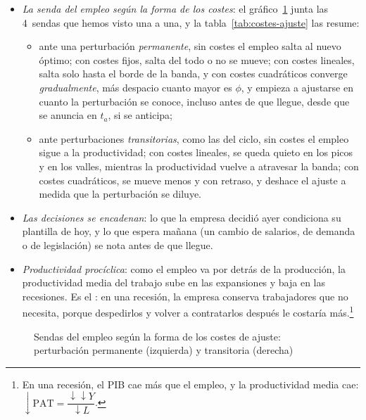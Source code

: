 \documentclass[11pt]{article}
\begin{document}
\begin{itemize}
\item \emph{La senda del empleo según la forma de los costes}: el gráfico~\ref{fig:sendas-ajuste} junta las 4~sendas que hemos visto una a una, y la tabla~\ref{tab:costes-ajuste} las resume:
  \begin{itemize}
  \item ante una perturbación \emph{permanente}, sin costes el empleo salta al nuevo óptimo; con costes fijos, salta del todo o no se mueve; con costes lineales, salta solo hasta el borde de la banda, y con costes cuadráticos converge \emph{gradualmente}, más despacio cuanto mayor es $\phi$, y empieza a ajustarse en cuanto la perturbación se conoce, incluso antes de que llegue, desde que se anuncia en $t_a$, si se anticipa;
  \item ante perturbaciones \emph{transitorias}, como las del ciclo, sin costes el empleo sigue a la productividad; con costes lineales, se queda quieto en los picos y en los valles, mientras la productividad vuelve a atravesar la banda; con costes cuadráticos, se mueve menos y con retraso, y deshace el ajuste a medida que la perturbación se diluye.
  \end{itemize}
\item \emph{Las decisiones se encadenan}: lo que la empresa decidió ayer condiciona su plantilla de hoy, y lo que espera mañana (un cambio de salarios, de demanda o de legislación) se nota antes de que llegue.
\item \emph{Productividad procíclica}: como el empleo va por detrás de la producción, la productividad media del trabajo sube en las expansiones y baja en las recesiones. Es el : en una recesión, la empresa conserva trabajadores que no necesita, porque despedirlos y volver a contratarlos después le costaría más\nocite{Oi1962Labor}.\footnote{En una recesión, el PIB cae más que el empleo, y la productividad media cae: $\downarrow\mathrm{PAT}=\dfrac{\downarrow\downarrow Y}{\downarrow L}$.}
\end{itemize}

\begin{figure}[H]
\centering
\caption{Sendas del empleo según la forma de los costes de ajuste: perturbación permanente (izquierda) y transitoria (derecha)}\label{fig:sendas-ajuste}
\end{figure}
\end{document}

